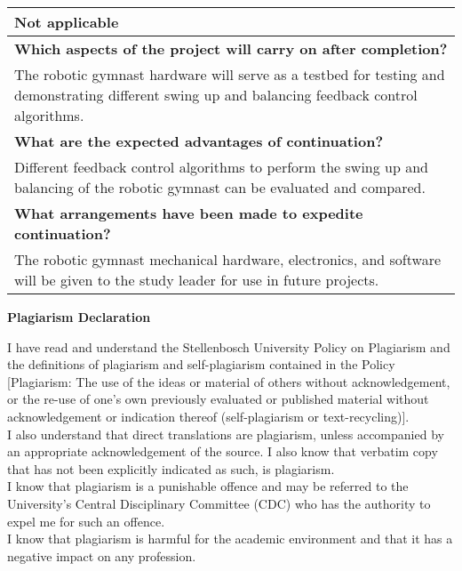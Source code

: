 \begin{table}[!h]
\begin{tabular}{|P{15cm}|}
			\hline 
			Not applicable \\
			\hline 
			\textbf{Which aspects of the project will carry on after completion?} \\
			\hline
			The robotic gymnast hardware will serve as a testbed for testing and demonstrating different swing up and balancing feedback control algorithms. \\
			\hline 
			\textbf{What are the expected advantages of continuation?} \\
			\hline 
			Different feedback control algorithms to perform the swing up and balancing of the robotic gymnast can be evaluated and compared. \\
			\hline 
			\textbf{What arrangements have been made to expedite continuation?} \\
			\hline 
			The robotic gymnast mechanical hardware, electronics, and software will be given to the study leader for use in future projects. \\
			\hline
			
			
			
			
			
		\end{tabular}
	\end{table}
\newpage
\begin{center}
	\textbf{\Large Plagiarism Declaration}
\end{center}

I have read and understand the Stellenbosch University Policy on Plagiarism and the definitions of plagiarism and self-plagiarism contained in the Policy [Plagiarism: The use of the ideas or material of others without acknowledgement, or the re-use of one's own previously evaluated or published material without acknowledgement or indication thereof (self-plagiarism or text-recycling)].\\

I also understand that direct translations are plagiarism, unless accompanied by an appropriate acknowledgement of the source. I also know that verbatim copy that has not been explicitly indicated as such, is plagiarism.\\

I know that plagiarism is a punishable offence and may be referred to the University's Central Disciplinary Committee (CDC) who has the authority to expel me for such an offence.\\

I know that plagiarism is harmful for the academic environment and that it has a negative impact on any profession.\\

